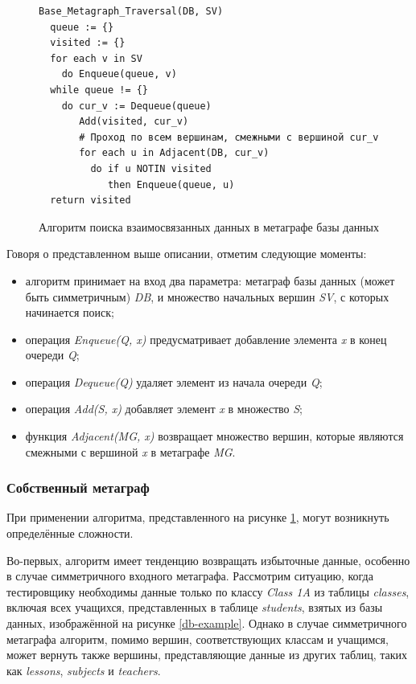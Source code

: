 \begin{figure}
  \begin{lstlisting}
Base_Metagraph_Traversal(DB, SV)
  queue := {}
  visited := {}
  for each v in SV
    do Enqueue(queue, v)
  while queue != {}
    do cur_v := Dequeue(queue)
       Add(visited, cur_v)
       # Проход по всем вершинам, смежными с вершиной cur_v
       for each u in Adjacent(DB, cur_v)
         do if u NOTIN visited
            then Enqueue(queue, u)
  return visited
  \end{lstlisting}
  \caption{Алгоритм поиска взаимосвязанных данных в метаграфе базы данных}
  \label{base-algorithm}
\end{figure}

Говоря о представленном выше описании, отметим следующие моменты:
\begin{itemize}
  \item алгоритм принимает на вход два параметра: метаграф базы данных (может быть симметричным) \textit{DB}, и множество начальных вершин \textit{SV}, с которых начинается поиск;
  \item операция \textit{Enqueue(Q, x)} предусматривает добавление элемента \textit{x} в конец очереди \textit{Q};
  \item операция \textit{Dequeue(Q)} удаляет элемент из начала очереди \textit{Q};
  \item операция \textit{Add(S, x)} добавляет элемент \textit{x} в множество \textit{S};
  \item функция \textit{Adjacent(MG, x)} возвращает множество вершин, которые являются смежными с вершиной \textit{x} в метаграфе \textit{MG}.
\end{itemize}

\subsubsection{Собственный метаграф}

При применении алгоритма, представленного на рисунке \ref{base-algorithm}, могут возникнуть определённые сложности.

Во-первых, алгоритм имеет тенденцию возвращать избыточные данные, особенно в случае симметричного входного метаграфа. Рассмотрим ситуацию, когда тестировщику необходимы данные только по классу \textit{Class 1A} из таблицы \textit{classes}, включая всех учащихся, представленных в таблице \textit{students}, взятых из базы данных, изображённой на рисунке \ref{db-example}. Однако в случае симметричного метаграфа алгоритм, помимо вершин, соответствующих классам и учащимся, может вернуть также вершины, представляющие данные из других таблиц, таких как \textit{lessons}, \textit{subjects} и \textit{teachers}.

